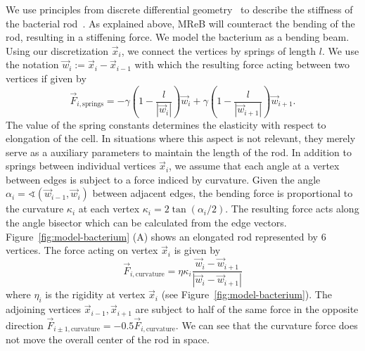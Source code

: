 We use principles from discrete differential geometry~\cite{bobenko2008discrete} to describe the
stiffness of the bacterial rod~\cite{Amir2014_2}.
As explained above, MReB will counteract the bending of the rod, resulting in a stiffening force.
We model the bacterium as a bending beam.
Using our discretization $\vec{x}_i$, we connect the vertices by springs of length $l$.
We use the notation $\vec{w}_i:=\vec{x}_i-\vec{x}_{i-1}$ with which the resulting force acting
between two vertices if given by
\begin{equation}
    \vec{F}_{i,\text{springs}} =
    -\gamma\left(1 - \frac{l}{\left|\vec{w}_i\right|}\right) \vec{w}_i
    + \gamma\left(1 - \frac{l}{\left|\vec{w}_{i+1}\right|}\right) \vec{w}_{i+1}.
\end{equation}
The value of the spring constants determines the elasticity with respect to elongation of the cell.
In situations where this aspect is not relevant, they merely serve as a auxiliary parameters to
maintain the length of the rod.
In addition to springs between individual vertices $\vec{x}_i$, we assume that each angle at a
vertex between edges is subject to a force indiced by curvature.
Given the angle $\alpha_i = \sphericalangle(\vec{w}_{i-1},\vec{w}_i)$ between adjacent edges,
the bending force is proportional to the curvature $\kappa_i$ at each vertex
$\kappa_i = 2\tan(\alpha_i/2)$.
The resulting force acts along the angle bisector which can be calculated from the edge vectors.
Figure~\ref{fig:model-bacterium} (A) shows an elongated rod represented by $6$ vertices.
The force acting on vertex $\vec{x}_i$ is given by
\begin{equation}
    \vec{F}_{i,\text{curvature}} = \eta\kappa_i
    \frac{\vec{w}_i - \vec{w}_{i+1}}{|\vec{w}_i-\vec{w}_{i+1}|}
\end{equation}
where $\eta_i$ is the rigidity at vertex $\vec{x}_i$ (see Figure~\ref{fig:model-bacterium}).
The adjoining vertices $\vec{x}_{i-1},\vec{x}_{i+1}$ are subject to half of the same force in the
opposite direction $\vec{F}_{i\pm 1,\text{curvature}} = -0.5\vec{F}_{i,\text{curvature}}$.
We can see that the curvature force does not move the overall center of the rod in space.
